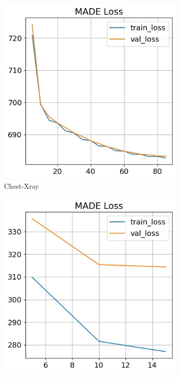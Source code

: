 \documentclass[journal]{IEEEtai}
\begin{document}
\begin{figure}[ht!]
	\centering
	\begin{subfigure}[t]{0.3\linewidth}	
		\includegraphics[width=\linewidth]{Figures/xray/MADE_loss}
		\caption{Chest-Xray }
		\label{fig:made_loss_xray}
	\end{subfigure}
	\hspace{0.01em}%
	\begin{subfigure}[t]{0.3\linewidth}
		\includegraphics[width=\linewidth]{Figures/femnist/MADE_loss}

\end{subfigure}
\end{figure}
\end{document}
